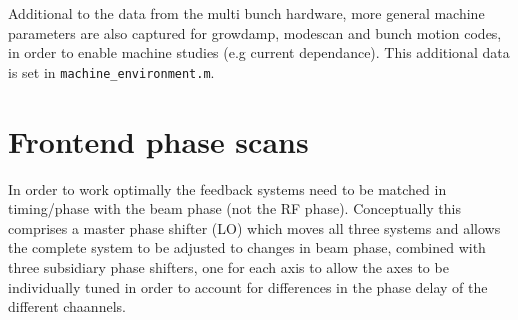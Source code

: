 \documentclass{report}
\begin{document}
Additional to the data from the multi bunch hardware, more general machine parameters are also captured for growdamp, modescan and bunch motion codes, in order to enable machine studies (e.g current dependance). This additional data is set in \verb|machine_environment.m|.


\chapter{Frontend phase scans}
In order to work optimally the feedback systems need to be matched in timing/phase with the beam phase (not the RF phase). Conceptually this comprises a master phase shifter (LO) which moves all three systems and allows the complete system to be adjusted to changes in beam phase, combined with three subsidiary phase shifters, one for each axis to allow the axes to be individually tuned in order to account for differences in the phase delay of the different chaannels. 
\end{document}
